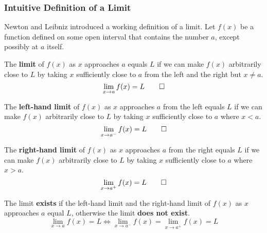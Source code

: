 \subsubsection{Intuitive Definition of a Limit}
Newton and Leibniz introduced a working definition of a limit.
Let \(f(x)\) be a function defined on some open interval that contains the
number \(a\), except possibly at \(a\) itself.
\begin{definition}
    The \textbf{limit} of \(f(x)\) as \(x\) approaches \(a\) equals \(L\) if
    we can make \(f(x)\) arbitrarily close to \(L\) by taking \(x\)
    sufficiently close to \(a\) from the left and the right but \(x\neq a\).
    \[\lim_{x\to a}f(x)=L \qedhere\]
\end{definition}
\begin{definition}
    The \textbf{left-hand limit} of \(f(x)\) as \(x\) approaches \(a\) from
    the left equals \(L\) if we can make \(f(x)\) arbitrarily close to \(L\)
    by taking \(x\) sufficiently close to \(a\) where \(x<a\).
    \[\lim_{x\to a^-}f(x)=L \qedhere\]
\end{definition}
\begin{definition}
    The \textbf{right-hand limit} of \(f(x)\) as \(x\) approaches \(a\) from
    the right equals \(L\) if we can make \(f(x)\) arbitrarily close to \(L\)
    by taking \(x\) sufficiently close to \(a\) where \(x>a\).
    \[\lim_{x\to a^+}f(x)=L\qedhere\]
\end{definition}
The limit \textbf{exists} if the left-hand limit and the right-hand limit of
\(f(x)\) as \(x\) approaches \(a\) equal \(L\), otherwise the limit
\textbf{does not exist}.
\[\lim_{x\to a}f(x)=L \iff \lim_{x\to a^-}f(x) = \lim_{x\to a^+}f(x)=L\]